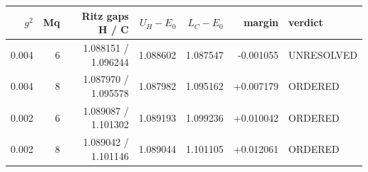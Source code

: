 \begin{tabular}{@{}rrrrrrl@{}}\toprule $g^2$&Mq&Ritz gaps H / C&$U_H-E_0$&$L_C-E_0$&margin&verdict\\\midrule
0.004&6&1.088151 / 1.096244&1.088602&1.087547&-0.001055&UNRESOLVED\\
0.004&8&1.087970 / 1.095578&1.087982&1.095162&+0.007179&ORDERED\\
0.002&6&1.089087 / 1.101302&1.089193&1.099236&+0.010042&ORDERED\\
0.002&8&1.089042 / 1.101146&1.089044&1.101105&+0.012061&ORDERED\\
\bottomrule\end{tabular}
